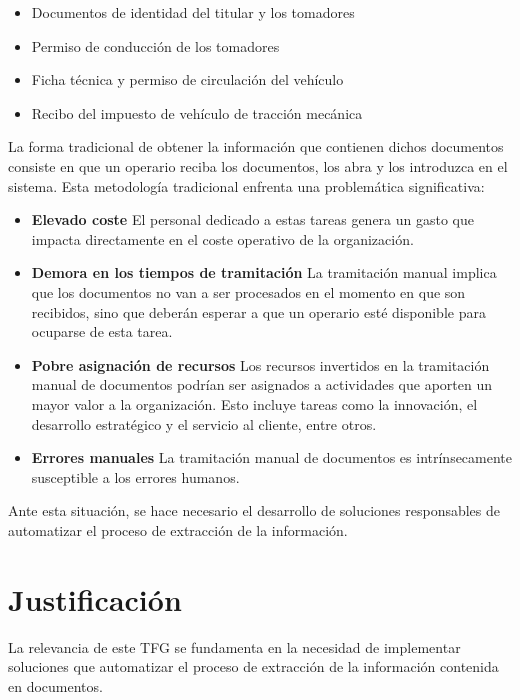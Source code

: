 \begin{itemize}
    \item Documentos de identidad del titular y los tomadores
    \item Permiso de conducción de los tomadores
    \item Ficha técnica y permiso de circulación del vehículo
    \item Recibo del impuesto de vehículo de tracción mecánica
\end{itemize}

La forma tradicional de obtener la información que contienen dichos documentos consiste en que un operario reciba los
documentos, los abra y los introduzca en el sistema.
Esta metodología tradicional enfrenta una problemática significativa:

\begin{itemize}
    \item \textbf{Elevado coste}
    El personal dedicado a estas tareas genera un gasto que impacta directamente en el coste operativo de la
    organización.
    \item \textbf{Demora en los tiempos de tramitación}
    La tramitación manual implica que los documentos no van a ser procesados en el momento en que son recibidos, sino
    que deberán esperar a que un operario esté disponible para ocuparse de esta tarea.
    \item \textbf{Pobre asignación de recursos}
    Los recursos invertidos en la tramitación manual de documentos podrían ser asignados a actividades que aporten un
    mayor valor a la organización.
    Esto incluye tareas como la innovación, el desarrollo estratégico y el servicio al cliente, entre otros.
    \item \textbf{Errores manuales} La tramitación manual de documentos es intrínsecamente susceptible a los errores
    humanos.
\end{itemize}

Ante esta situación, se hace necesario el desarrollo de soluciones responsables de automatizar el proceso de extracción
de la información.


\section{Justificación}

La relevancia de este TFG se fundamenta en la necesidad de implementar soluciones que automatizar el proceso de
extracción de la información contenida en documentos.

